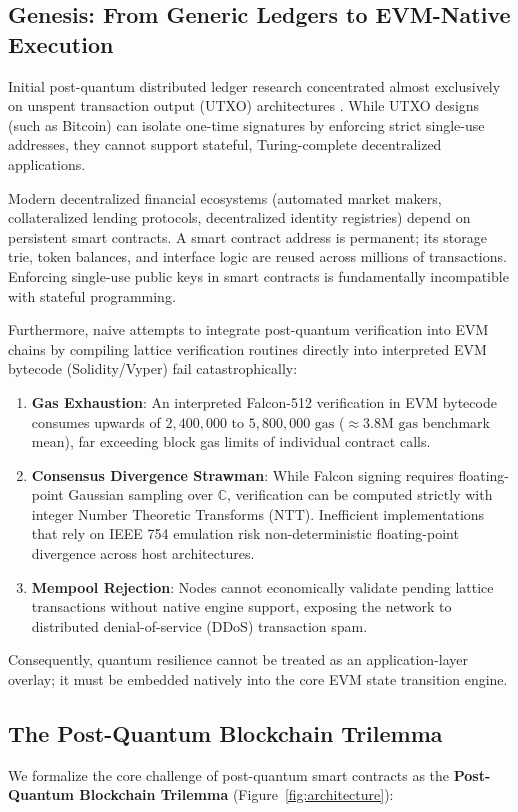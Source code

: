 \documentclass[a4paper,fleqn]{cas-dc}
\begin{document}
\subsection{Genesis: From Generic Ledgers to EVM-Native Execution}
Initial post-quantum distributed ledger research concentrated almost exclusively on unspent transaction output (UTXO) architectures \citep{aggarwal2018quantum}. While UTXO designs (such as Bitcoin) can isolate one-time signatures by enforcing strict single-use addresses, they cannot support stateful, Turing-complete decentralized applications. 

Modern decentralized financial ecosystems (automated market makers, collateralized lending protocols, decentralized identity registries) depend on persistent smart contracts. A smart contract address is permanent; its storage trie, token balances, and interface logic are reused across millions of transactions. Enforcing single-use public keys in smart contracts is fundamentally incompatible with stateful programming.

Furthermore, naive attempts to integrate post-quantum verification into EVM chains by compiling lattice verification routines directly into interpreted EVM bytecode (Solidity/Vyper) fail catastrophically:
\begin{enumerate}
    \item \textbf{Gas Exhaustion}: An interpreted Falcon-512 verification in EVM bytecode consumes upwards of $2,400,000\text{ to }5,800,000\text{ gas}$ ($\approx 3.8\text{M gas}$ benchmark mean), far exceeding block gas limits of individual contract calls.
    \item \textbf{Consensus Divergence Strawman}: While Falcon signing requires floating-point Gaussian sampling over $\mathbb{C}$, verification can be computed strictly with integer Number Theoretic Transforms (NTT). Inefficient implementations that rely on IEEE 754 emulation risk non-deterministic floating-point divergence across host architectures.
    \item \textbf{Mempool Rejection}: Nodes cannot economically validate pending lattice transactions without native engine support, exposing the network to distributed denial-of-service (DDoS) transaction spam.
\end{enumerate}
Consequently, quantum resilience cannot be treated as an application-layer overlay; it must be embedded natively into the core EVM state transition engine.

\subsection{The Post-Quantum Blockchain Trilemma}
We formalize the core challenge of post-quantum smart contracts as the \textbf{Post-Quantum Block\-chain Trilemma} (Figure~\ref{fig:architecture}):
\end{document}
